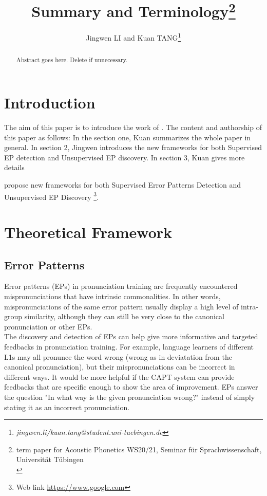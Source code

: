 \documentclass[nobib]{tufte-handout}
\title{\cite{wang2015supervised} Summary and Terminology\thanks{term paper for Acoustic Phonetics WS20/21, Seminar f\"ur Sprachwissenschaft, Universit\"at T\"ubingen\\}}
\author{Jingwen LI and Kuan TANG\thanks{\it{jingwen.li/kuan.tang@student.uni-tuebingen.de}}}
\date{}
\begin{document}
\maketitle

\begin{abstract}%
\noindent Abstract goes here. Delete if unnecessary.
\end{abstract}

\bigskip
\section{Introduction}

The aim of this paper is to introduce the work of  \cite{wang2015supervised}. The content and authorship  of this paper as follows: In the section one, Kuan summarizes the whole paper \cite{wang2015supervised} in general. In section 2, Jingwen introduces the new frameworks for both Supervised EP detection and  Unsupervised EP discovery. In section 3, Kuan gives more details 

\cite{wang2015supervised} propose new frameworks for both Supervised Error Patterns Detection and Unsupervised EP Discovery \footnote{Web link \url{https://www.google.com}}.

\bigskip
\section{Theoretical Framework}
\subsection{\textbf{Error Patterns}}

\noindent Error patterns (EPs) in pronunciation training are frequently encountered mispronunciations that have intrinsic commonalities. In other words, mispronunciations of the same error pattern usually display a high level of intra-group similarity, although they can still be very close to the canonical pronunciation or other EPs.\\

\noindent The discovery and detection of EPs can help give more informative and targeted feedbacks in pronunciation training. For example, language learners of different L1s may all pronunce the word wrong (wrong as in deviatation from the canonical pronunciation), but their mispronunciations can be incorrect in different ways. It would be more helpful if the CAPT system can provide feedbacks that are specific enough to show the area of improvement. EPs answer the question "In what way is the given pronunciation wrong?" instead of simply stating it as an incorrect pronunciation.
\end{document}
